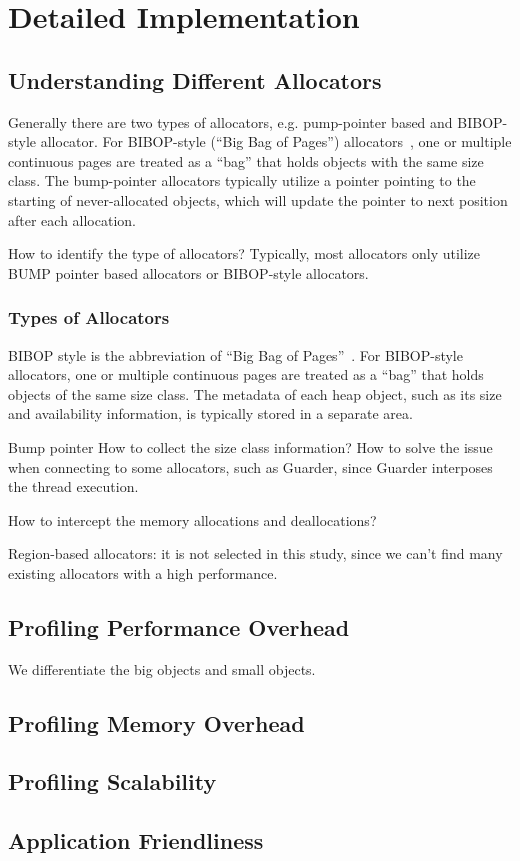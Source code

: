 \section{Detailed Implementation}





\subsection{Understanding Different Allocators}

Generally there are two types of allocators, e.g. pump-pointer based and BIBOP-style allocator. For BIBOP-style (``Big Bag of Pages'') allocators~\cite{hanson1980}, one or multiple continuous pages are treated as a ``bag'' that holds objects with the same size class.  The bump-pointer allocators typically utilize a pointer pointing to the starting of never-allocated objects, which will update the pointer to next position after each allocation.   


How to identify the type of allocators? Typically, most allocators only utilize BUMP pointer based allocators or BIBOP-style allocators. 

\subsubsection{Types of Allocators}
BIBOP style is the abbreviation of ``Big Bag of Pages''~\cite{hanson1980}.
For BIBOP-style allocators, one or multiple continuous pages are treated as a ``bag'' that holds objects of the same size class. The metadata of each heap object, such as its size and availability information, is typically stored in a separate area.

Bump pointer
How to collect the size class information?
How to solve the issue when connecting to some allocators, such as Guarder, since Guarder interposes the thread execution. 

How to intercept the memory allocations and deallocations? 

Region-based allocators: 
it is not selected in this study, since we can't find many existing allocators with a high performance. 


\subsection{Profiling Performance Overhead}

We differentiate the big objects and small objects. 

\subsection{Profiling Memory Overhead}

\subsection{Profiling Scalability}

\subsection{Application Friendliness}
